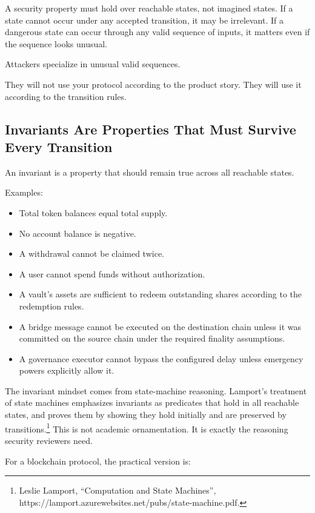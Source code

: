 A security property must hold over reachable states, not imagined
states. If a state cannot occur under any accepted transition, it may be
irrelevant. If a dangerous state can occur through any valid sequence of
inputs, it matters even if the sequence looks unusual.

Attackers specialize in unusual valid sequences.

They will not use your protocol according to the product story. They
will use it according to the transition rules.

\subsection{Invariants Are Properties That Must Survive Every
Transition}

An invariant is a property that should remain true across all reachable
states.

Examples:

\begin{itemize}
\tightlist
\item
  Total token balances equal total supply.
\item
  No account balance is negative.
\item
  A withdrawal cannot be claimed twice.
\item
  A user cannot spend funds without authorization.
\item
  A vault's assets are sufficient to redeem outstanding shares according
  to the redemption rules.
\item
  A bridge message cannot be executed on the destination chain unless it
  was committed on the source chain under the required finality
  assumptions.
\item
  A governance executor cannot bypass the configured delay unless
  emergency powers explicitly allow it.
\end{itemize}

The invariant mindset comes from state-machine reasoning. Lamport's
treatment of state machines emphasizes invariants as predicates that
hold in all reachable states, and proves them by showing they hold
initially and are preserved by transitions.\footnote{Leslie Lamport,
  ``Computation and State Machines'',
  https://lamport.azurewebsites.net/pubs/state-machine.pdf.} This is not
academic ornamentation. It is exactly the reasoning security reviewers
need.

For a blockchain protocol, the practical version is:

